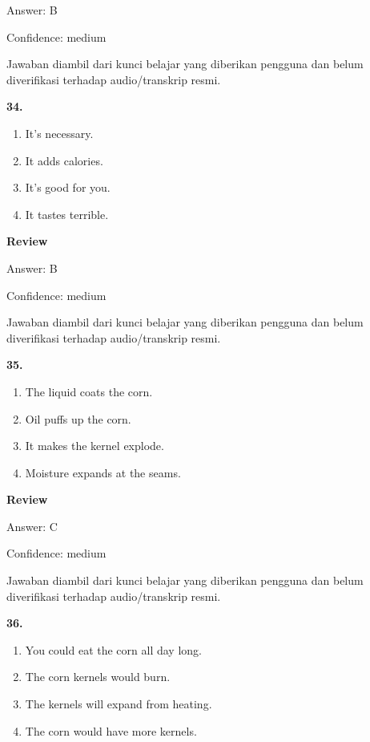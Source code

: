 \documentclass[12pt]{article}
\begin{document}
Answer: B\par
Confidence: medium\par
Jawaban diambil dari kunci belajar yang diberikan pengguna dan belum diverifikasi terhadap audio/transkrip resmi.\par
\endgroup
\par
\vspace{0.25\baselineskip}
\noindent\textbf{34.}
\begin{enumerate}[label=(\Alph*),leftmargin=*,itemsep=0.2em]
\item It's necessary.
\item It adds calories.
\item It's good for you.
\item It tastes terrible.
\end{enumerate}
\par
\begingroup
\setlength{\parskip}{0pt}
\setlength{\parindent}{0pt}
\textbf{Review}\par
Answer: B\par
Confidence: medium\par
Jawaban diambil dari kunci belajar yang diberikan pengguna dan belum diverifikasi terhadap audio/transkrip resmi.\par
\endgroup
\par
\vspace{0.25\baselineskip}
\noindent\textbf{35.}
\begin{enumerate}[label=(\Alph*),leftmargin=*,itemsep=0.2em]
\item The liquid coats the corn.
\item Oil puffs up the corn.
\item It makes the kernel explode.
\item Moisture expands at the seams.
\end{enumerate}
\par
\begingroup
\setlength{\parskip}{0pt}
\setlength{\parindent}{0pt}
\textbf{Review}\par
Answer: C\par
Confidence: medium\par
Jawaban diambil dari kunci belajar yang diberikan pengguna dan belum diverifikasi terhadap audio/transkrip resmi.\par
\endgroup
\par
\vspace{0.25\baselineskip}
\noindent\textbf{36.}
\begin{enumerate}[label=(\Alph*),leftmargin=*,itemsep=0.2em]
\item You could eat the corn all day long.
\item The corn kernels would burn.
\item The kernels will expand from heating.
\item The corn would have more kernels.
\end{enumerate}
\end{document}
